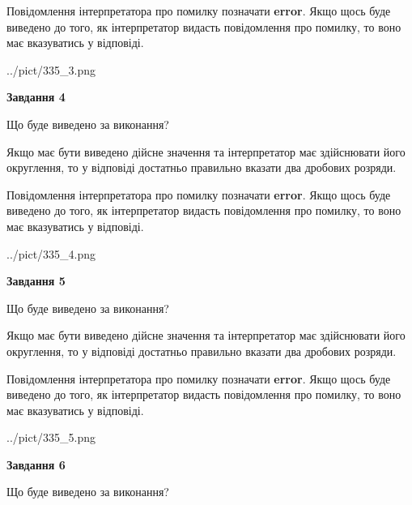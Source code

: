 \documentclass[12pt, ukrainian]{article}
\begin{document}
{\begin {Large}
Повідомлення інтерпретатора про помилку позначати \textbf{error}.
Якщо щось буде виведено до того, як інтерпретатор видасть повідомлення про помилку, 
то воно має вказуватись у відповіді. \par

\begin{center}
	{../pict/335_3.png}
\end{center}
\newpage

{\begin {center}\textbf{Завдання 4}\end {center}}\par
Що буде виведено за виконання? \par

Якщо має бути виведено дійсне значення та інтерпретатор має здійснювати його округлення, 
то у відповіді достатньо правильно вказати два дробових розряди.

Повідомлення інтерпретатора про помилку позначати \textbf{error}.
Якщо щось буде виведено до того, як інтерпретатор видасть повідомлення про помилку, 
то воно має вказуватись у відповіді. \par

\begin{center}
	{../pict/335_4.png}
\end{center}
\newpage

{\begin {center}\textbf{Завдання 5}\end {center}}\par
Що буде виведено за виконання? \par

Якщо має бути виведено дійсне значення та інтерпретатор має здійснювати його округлення, 
то у відповіді достатньо правильно вказати два дробових розряди.

Повідомлення інтерпретатора про помилку позначати \textbf{error}.
Якщо щось буде виведено до того, як інтерпретатор видасть повідомлення про помилку, 
то воно має вказуватись у відповіді. \par

\begin{center}
	{../pict/335_5.png}
\end{center}
\newpage

{\begin {center}\textbf{Завдання 6}\end {center}}\par
Що буде виведено за виконання? \par


\end{Large}}
\end{document}
